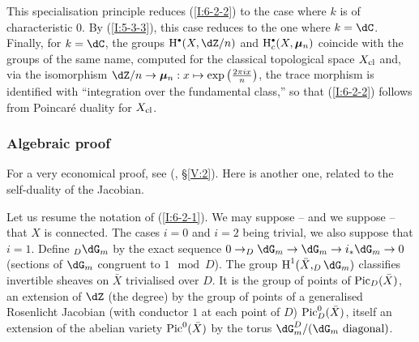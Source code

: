 This specialisation principle reduces (\ref{I:6-2-2}) to the case where $k$ is
of characteristic $0$. By (\ref{I:5-3-3}), this case reduces to the one where
$k=\dC$. Finally, for $k=\dC$, the groups $\h^\bullet(X,\dZ/n)$ and
$\h_c^\bullet(X,\dmu_n)$ coincide with the groups of the same name, computed
for the classical topological space $X_{\textnormal{cl}}$ and, via
the isomorphism $\dZ/n\to \dmu_n: x\mapsto \exp\left(\frac{2\pi i x}{n}\right)$,
the trace morphism is identified with ``integration over the fundamental
class,'' so that (\ref{I:6-2-2}) follows from Poincar\'e duality for
$X_{\textnormal{cl}}$. 





\subsubsection{Algebraic proof}\label{I:6-2-3}

For a very economical proof, see (, \S\ref{V:2}).
Here is another one, related to the self-duality of the Jacobian.

Let us resume the notation of (\ref{I:6-2-1}). We may suppose -- and we
suppose -- that $X$ is connected. The cases $i=0$ and $i=2$ being trivial, we
also suppose that $i=1$. Define $_D\dG_m$ by the exact sequence
$0\to _D\dG_m \to \dG_m \to i_*\dG_m\to 0$ (sections of $\dG_m$ congruent to
$1\mod D$). The group $\h^1(\bar X, _D\dG_m)$ classifies invertible
sheaves on $\bar X$ trivialised over $D$. It is the group of points of
$\operatorname{Pic}_D(\bar X)$, an extension of $\dZ$ (the degree) by the group of points
of a generalised Rosenlicht Jacobian (with conductor
$1$ at each point of $D$) $\operatorname{Pic}_D^0(\bar X)$, itself an extension of the
abelian variety $\operatorname{Pic}^0(\bar X)$ by the torus
$\dG_m^D/(\text{$\dG_m$ diagonal})$. 

